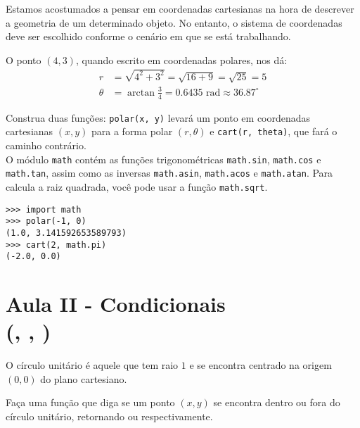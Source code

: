 \documentclass[12pt]{article}
\begin{document}
	\vfill
	
	\pagebreak
	
	
	Estamos acostumados a pensar em coordenadas cartesianas na hora de descrever a geometria de um determinado objeto. No entanto, o sistema de coordenadas deve ser escolhido conforme o cenário em que se está trabalhando.
	
	
	
	O ponto $(4, 3)$, quando escrito em coordenadas polares, nos dá:
	\begin{align*}
	r &= \sqrt{4^2 + 3^2} = \sqrt{16 + 9} = \sqrt{25} = 5\\
	\theta &= \arctan\frac{3}{4} = 0.6435 \text{ rad} \approx 36.87^{\circ}
	\end{align*}
	
	\quest Construa duas funções: \texttt{polar(x, y)} levará um ponto em coordenadas cartesianas $(x, y)$ para a forma polar $(r, \theta)$ e \texttt{cart(r, theta)}, que fará o caminho contrário.\\
	
	\clue O módulo \texttt{math} contém as funções trigonométricas \texttt{math.sin}, \texttt{math.cos} e \texttt{math.tan}, assim como as inversas \texttt{math.asin}, \texttt{math.acos} e \texttt{math.atan}. Para calcula a raiz quadrada, você pode usar a função \texttt{math.sqrt}.\\
	
	\example
	\begin{lstlisting}
>>> import math
>>> polar(-1, 0)
(1.0, 3.141592653589793)
>>> cart(2, math.pi)
(-2.0, 0.0)
	\end{lstlisting}
	
	\pagebreak
	
	
	\pagebreak
	
	\section{Aula II - Condicionais \\(, , )}
	
	
	O círculo unitário é aquele que tem raio $1$ e se encontra centrado na origem $(0, 0)$ do plano cartesiano.
	
	
	
	\quest Faça uma função que diga se um ponto $(x, y)$ se encontra dentro ou fora do círculo unitário, retornando  ou  respectivamente.\\
	
\end{document}
